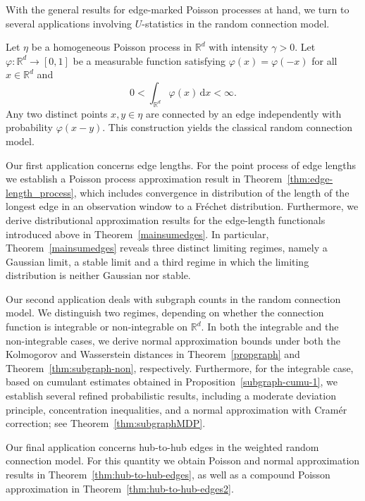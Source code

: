 \documentclass{article}
\theoremstyle{definition}
\numberwithin{equation}{section}
\theoremstyle{remark}
\begin{document}
With the general results for edge-marked Poisson processes at hand, we turn to several applications involving $U$-statistics in the random connection model.

Let $\eta$ be a homogeneous Poisson process in $\mathbb{R}^d$ with intensity $\gamma>0$. Let $\varphi\colon \mathbb{R}^d \to [0,1]$ be a measurable function satisfying $\varphi(x)=\varphi(-x)$ for all $x\in\mathbb{R}^d$ and
\begin{equation}\label{g1}
0< \int_{\mathbb{R}^d} \varphi(x)\,\mathrm{d}x < \infty .
\end{equation}
Any two distinct points $x,y\in\eta$ are connected by an edge independently with probability $\varphi(x-y)$. This construction yields the classical random connection model.

Our first application concerns edge lengths. For the point process of edge lengths we establish a Poisson process approximation result in Theorem~\ref{thm:edge-length_process}, which includes convergence in distribution of the length of the longest edge in an observation window to a Fr\'echet distribution. Furthermore, we derive distributional approximation results for the edge-length functionals introduced above in Theorem~\ref{mainsumedges}. In particular, Theorem~\ref{mainsumedges} reveals three distinct limiting regimes, namely a Gaussian limit, a stable limit and a third regime in which the limiting distribution is neither Gaussian nor stable. 

Our second application deals with subgraph counts in the random connection model. We distinguish two regimes, depending on whether the connection function is integrable or non-integrable on $\mathbb{R}^d$. In both the integrable and the non-integrable cases, we derive normal approximation bounds under both the Kolmogorov and Wasserstein distances in Theorem~\ref{propgraph} and Theorem~\ref{thm:subgraph-non}, respectively. Furthermore, for the integrable case, based on cumulant estimates obtained in Proposition~\ref{subgraph-cumu-1}, we establish several refined probabilistic results, including a moderate deviation principle, concentration inequalities, and a normal approximation with Cramér correction; see Theorem~\ref{thm:subgraphMDP}. 

Our final application concerns hub-to-hub edges in the weighted random connection model. For this quantity we obtain Poisson and normal approximation results in Theorem~\ref{thm:hub-to-hub-edges}, as well as a compound Poisson approximation in Theorem~\ref{thm:hub-to-hub-edges2}.
\end{document}
